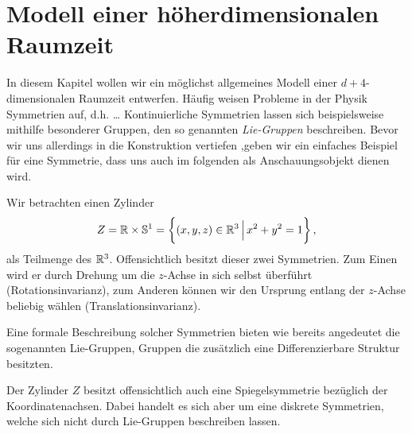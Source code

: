 \section{Modell einer höherdimensionalen Raumzeit}
In diesem Kapitel wollen wir ein möglichst allgemeines Modell einer
$d+4$-dimensionalen Raumzeit entwerfen. Häufig weisen Probleme in der Physik
Symmetrien auf, d.h. \ldots
Kontinuierliche Symmetrien lassen sich beispielsweise mithilfe besonderer
Gruppen, den so genannten \emph{Lie-Gruppen} beschreiben.
Bevor wir uns allerdings in die Konstruktion vertiefen ,geben wir ein einfaches
Beispiel für eine Symmetrie, dass uns auch im folgenden als Anschauungsobjekt
dienen wird.
\begin{beispiel}
Wir betrachten einen Zylinder 
\begin{equation}
Z=\Reals\times\Sphere^1=\left\{(x,y,z)\in\Reals^3\,\Big|\,x^2+y^2=1\right\}\,,
\end{equation}
als Teilmenge des $\mathbb{R}^3$. 
Offensichtlich besitzt dieser zwei Symmetrien. Zum Einen wird er durch
Drehung um die $z$-Achse in sich selbst überführt (Rotationsinvarianz), zum
Anderen können wir den Ursprung entlang der $z$-Achse beliebig wählen
(Translationsinvarianz).
\end{beispiel}
Eine formale Beschreibung solcher Symmetrien bieten wie bereits angedeutet die
sogenannten Lie-Gruppen, Gruppen die zusätzlich eine Differenzierbare Struktur
besitzten.
\begin{definition}

\end{definition}
\begin{bemerkung}
Der Zylinder $Z$ besitzt offensichtlich auch eine Spiegelsymmetrie bezüglich der
Koordinatenachsen. Dabei handelt es sich aber um eine diskrete Symmetrien,
welche sich nicht durch Lie-Gruppen beschreiben lassen.
\end{bemerkung}
% 

\begin{beispiel}[$SO(n)$]

\end{beispiel}
